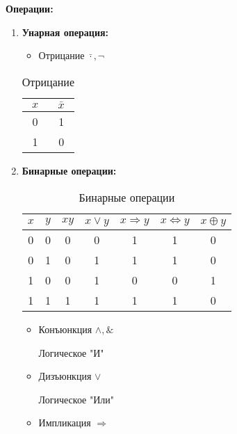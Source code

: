 \documentclass[a4paper,12pt]{article}
\begin{document}
    \textbf{Операции:}
    \begin{enumerate}
        \item \textbf{Унарная операция:}

        \begin{itemize}
            \item Отрицание $\bar \cdot, \lnot$
        \end{itemize}

        \begin{table}[ht]
            \centering
            \begin{tabular}{|c|c|}
                \hline
                $x$ &$\bar x$ \\ \hline
                0 & 1\\
                1 & 0\\ \hline
            \end{tabular}
            \caption{Отрицание}
        \end{table}

        \item \textbf{Бинарные операции:}

        \begin{table}[ht]
            \centering
            \begin{tabular}{|c|c|c|c|c|c|c|}
                \hline
                $x$ & $y$ & $xy$ & $x\vee y$ & $x\Longrightarrow y$ & $x\Longleftrightarrow y$ & $x \oplus y$  \\ \hline
                0 & 0 & 0 & 0 & 1 & 1 & 0\\ \hline
                0 & 1 & 0 & 1 & 1 & 1 & 0\\ \hline
                1 & 0 & 0 & 1 & 0 & 0 & 1\\ \hline
                1 & 1 & 1 & 1 & 1 & 1 & 0\\ \hline
            \end{tabular}
            \caption{Бинарные операции}
        \end{table}

        \begin{itemize}
            \item Конъюнкция $\wedge, \&$

            Логическое "И"

            \item Дизъюнкция $\vee$

            Логическое "Или"

            \item Импликация $\Longrightarrow$


\end{itemize}
\end{enumerate}
\end{document}

